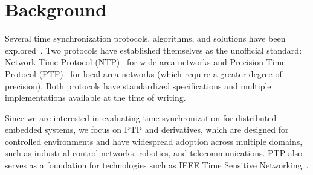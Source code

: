 
\section{Background} %
\label{sec:background}

Several time synchronization protocols, algorithms, and solutions
have been explored~\cite{ntpv4-spec, sntp-spec, linuxptp, time-protocol-flooding, time-protocol-pulsesync, white-rabbit, time-protocol-wsn, time-protocol-low-power}.
Two protocols have established themselves as the unofficial standard:
Network Time Protocol (NTP)~\cite{ntpv4-spec} for wide area networks %
and Precision Time Protocol (PTP)~\cite{ptp-spec} for local area networks %
(which require a greater degree of precision).
Both protocols have standardized specifications and multiple implementations
available at the time of writing.

Since we are interested in evaluating time synchronization for distributed
embedded systems,
we focus on PTP and derivatives,
which are designed for controlled environments
and have widespread adoption across multiple domains,
such as industrial control networks, robotics, and telecommunications.
PTP also serves as a foundation for technologies such as
IEEE Time Sensitive Networking~\cite{??}.


